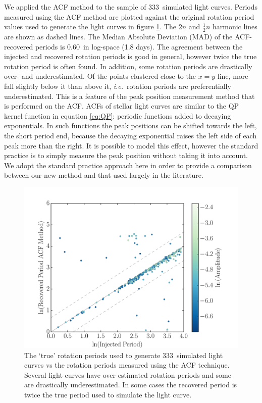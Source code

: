 \documentclass[useAMS, usenatbib, preprint, 12pt]{aastex}
\newcommand{\naigrain}{333}
\newcommand{\ie}{{\it i.e.}}
\newcommand{\acfRMS}{0.60}
\begin{document}
We applied the ACF method to the sample of \naigrain\ simulated light
curves.
Periods measured using the ACF method are plotted against the original
rotation period values used to generate the light curves in figure
\ref{fig:compare_acf}.
The $2n$ and $\frac{1}{2}n$ harmonic lines are shown as dashed lines.
The Median Absolute Deviation (MAD) of the ACF-recovered periods is \acfRMS\
in log-space (1.8 days).
The agreement between the injected and recovered rotation periods is good in
general, however twice the true rotation period is often found.
In addition, some rotation periods are drastically over- and underestimated.
Of the points clustered close to the $x=y$ line, more fall slightly below it
than above it, \ie\ rotation periods are preferentially underestimated.
This is a feature of the peak position measurement method that is performed on
the ACF.
ACFs of stellar light curves are similar to the QP kernel function in equation
\ref{eq:QP}: periodic functions added to decaying exponentials.
In such functions the peak positions can be shifted towards the left, the
short period end, because the decaying exponential raises the left side of
each peak more than the right.
It is possible to model this effect, however the standard practice is to
simply measure the peak position without taking it into account.
We adopt the standard practice approach here in order to provide a comparison
between our new method and that used largely in the literature.

\begin{figure}
\begin{center}
\includegraphics[width=6in, clip=true]{figures/compare_acf.pdf}
\caption[ACF results.]
{The `true' rotation periods used to generate \naigrain\ simulated light
curves vs the rotation periods measured using the ACF technique.
    Several light curves have over-estimated rotation periods and some
    are drastically underestimated.
    In some cases the recovered period is twice the true period used to
    simulate the light curve.}
\label{fig:compare_acf}
\end{center}
\end{figure}
\end{document}
